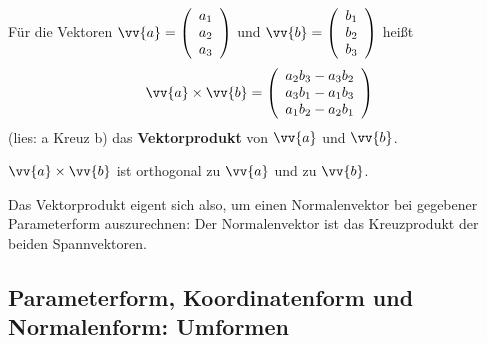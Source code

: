 \begin{definition}
    Für die Vektoren $\vv{a} = \left(\begin{array}{c}  a_1 \\ a_2 \\ a_3 \end{array}\right)$ und $\vv{b} = \left(\begin{array}{c}  b_1 \\ b_2 \\ b_3 \end{array}\right)$ heißt $$\vv{a} \times \vv{b} = \left(\begin{array}{c}  a_2b_3 - a_3b_2 \\ a_3b_1 - a_1b_3 \\ a_1b_2 - a_2b_1 \end{array}\right)$$ (lies: \glqq  a Kreuz b\grqq{}) das \textbf{Vektorprodukt} von $\vv{a}$ und $\vv{b}$.
\end{definition}
\begin{satz}
    $\vv{a} \times \vv{b}$ ist orthogonal zu $\vv{a}$ und zu $\vv{b}$.
\end{satz}

Das Vektorprodukt eigent sich also, um einen Normalenvektor bei gegebener Parameterform auszurechnen: Der Normalenvektor ist das Kreuzprodukt der beiden Spannvektoren.

\subsection{Parameterform, Koordinatenform und Normalenform: Umformen}

